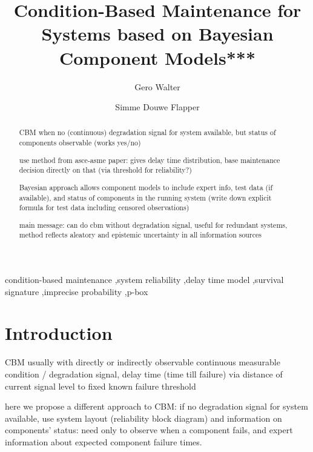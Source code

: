 \documentclass[authoryear]{elsarticle}
\begin{document}

\begin{frontmatter}
\title{Condition-Based Maintenance for Systems based on Bayesian Component Models***}

\author[tue]{Gero Walter}
\author[tue]{Simme Douwe Flapper}

\address[tue]{School of Industrial Engineering, Eindhoven University of Technology, Eindhoven, Netherlands}


\begin{abstract}
CBM when no (continuous) degradation signal for system available, but status of components observable (works yes/no)

use method from asce-asme paper:
gives delay time distribution, base maintenance decision directly on that
(via threshold for reliability?)

Bayesian approach allows
component models to include expert info, test data (if available), and status of components in the running system
(write down explicit formula for test data including censored observations)

main message: can do cbm without degradation signal,
useful for redundant systems,
method reflects aleatory and epistemic uncertainty in all information sources
\end{abstract}

\begin{keyword}
condition-based maintenance \sep system reliability \sep delay time model \sep survival signature \sep imprecise probability \sep p-box
\end{keyword}
\end{frontmatter}



\section{Introduction}
\label{intro}

CBM usually with directly or indirectly observable continuous measurable condition / degradation signal,
delay time (time till failure) via distance of current signal level to fixed known failure threshold

here we propose a different approach to CBM: if no degradation signal for system available,
use system layout (reliability block diagram) and information on components' status:
need only to observe when a component fails,
and expert information about expected component failure times.
\end{document}
